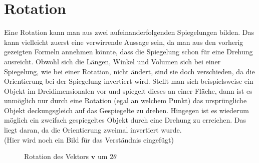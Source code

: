 %
%
%
\section{Rotation}

Eine Rotation kann man aus zwei aufeinanderfolgenden Spiegelungen bilden. Das kann vielleicht zuerst eine verwirrende Aussage sein, da man aus den vorherig gezeigten Formeln annehmen könnte, dass die Spiegelung schon für eine Drehung ausreicht. Obwohl sich die Längen, Winkel und Volumen sich bei einer Spiegelung, wie bei einer Rotation, nicht ändert, sind sie doch verschieden, da die Orientierung bei der Spiegelung invertiert wird. Stellt man sich beispielsweise ein Objekt im Dreidimensionalen vor und spiegelt dieses an einer Fläche, dann ist es unmöglich nur durch eine Rotation (egal an welchem Punkt) das ursprüngliche Objekt deckungsgleich auf das Gespiegelte zu drehen. Hingegen ist es wiederum möglich ein zweifach gespiegeltes Objekt durch eine Drehung zu erreichen. Das liegt daran, da die Orientierung zweimal invertiert wurde.
\\(Hier wird noch ein Bild für das Verständnis eingefügt)

\begin{figure}
	\centering
	\caption{Rotation des Vektors $\textbf{v}$ um $2\theta$}
	\label{BildRotation}
\end{figure}


